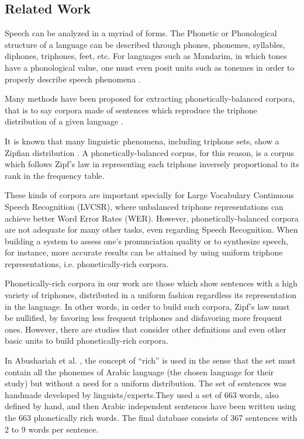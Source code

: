 \subsection{Related Work}

Speech can be analyzed in a myriad of forms. The Phonetic or Phonological structure of a 
language can be described through phones, phonemes, syllables, diphones, triphones, feet, etc. 
For languages such as Mandarim, in which tones have a phonological value, one must even posit 
units such as tonemes in order to properly describe speech phenomena \cite{Lei2005}.

Many methods have been proposed for extracting phonetically-balanced corpora, that is to say 
corpora made of sentences which reproduce the triphone distribution of a given language 
\cite{Abushariah2012}\cite{Shen1994}\cite{Timit1993}\cite{Uraga2004}. 

It is known that many linguistic phenomena, including triphone sets, show a Zipfian distribution
 \cite{Manning1999}.
A phonetically-balanced corpus, for this reason, is a corpus which follows Zipf's law in 
representing each triphone inversely proportional to its rank in the frequency table. 

These kinds of corpora are important specially for Large Vocabulary Continuous Speech 
Recognition (LVCSR), where unbalanced triphone representations can achieve better Word Error 
Rates (WER). However, phonetically-balanced corpora are not adequate for many other tasks, 
even regarding Speech Recognition. When building a system  to assess one's pronunciation 
quality or to synthesize speech, for instance, more accurate results can be attained by 
using uniform triphone representations, i.e. phonetically-rich corpora. 

Phonetically-rich corpora in our work are those which show sentences with a high variety of 
triphones, distributed in a uniform fashion regardless its representation in the language. 
In other words, in order to build such corpora, Zipf's law must be nullified, by favoring 
less frequent triphones and disfavoring more frequent ones. However, there are studies that 
consider other definitions and even other basic units to build phonetically-rich corpora.

In Abushariah et al. \cite{Abushariah2012}, the concept of ``rich'' is used in the sense that the set must 
contain all the phonemes of Arabic language (the chosen language for their study) 
but without a need for a uniform distribution. The set of sentences was handmade 
developed by linguists/experts.They used a set of 663 words, also defined  by hand, 
and then Arabic independent sentences have been written using the 663 phonetically 
rich words. The final database consists of 367 sentences with 2 to 9 words per sentence.

